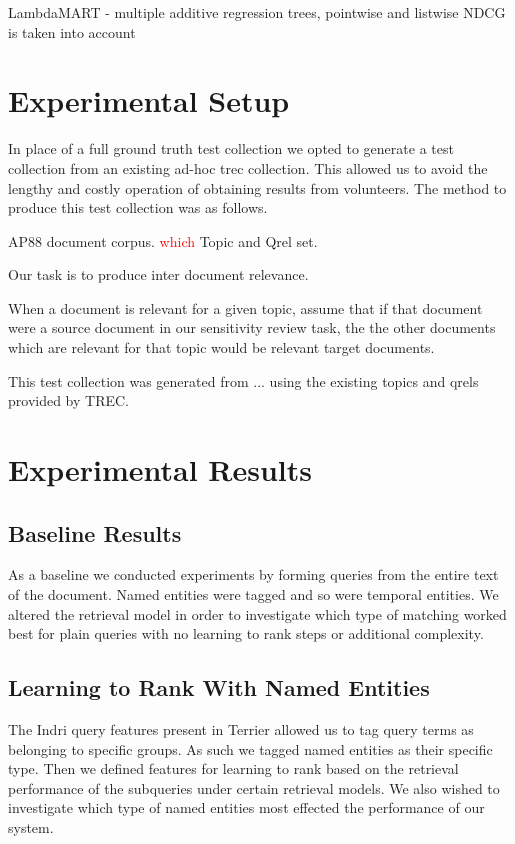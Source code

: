 \documentclass{mpaper}
\newcommand{\remove}[1]{\textcolor{red}{#1}}
\begin{document}
LambdaMART - multiple additive regression trees, pointwise and listwise
NDCG is taken into account

\section{Experimental Setup} \label{sec:setup}
In place of a full ground truth test collection we opted to generate a test collection from an existing ad-hoc trec collection. This allowed us to avoid the lengthy and costly operation of obtaining results from volunteers.
The method to produce this test collection was as follows.

AP88 document corpus.
\remove{which} Topic and Qrel set.

Our task is to produce inter document relevance.

When a document is relevant for a given topic, assume that if that document were a source document in our sensitivity review task, the the other documents which are relevant for that topic would be relevant target documents.

This test collection was generated from ... using the existing topics and qrels provided by TREC.


\section{Experimental Results} \label{sec:results}
\subsection{Baseline Results}
As a baseline we conducted experiments by forming queries from the entire text of the document.
Named entities were tagged and so were temporal entities.
We altered the retrieval model in order to investigate which type of matching worked best for plain queries with no learning to rank steps or additional complexity.

\subsection{Learning to Rank With Named Entities}
The Indri query features present in Terrier allowed us to tag query terms as belonging to specific groups. As such we tagged named entities as their specific type.
Then we defined features for learning to rank based on the retrieval performance of the subqueries under certain retrieval models.
We also wished to investigate which type of named entities most effected the performance of our system.
\end{document}
